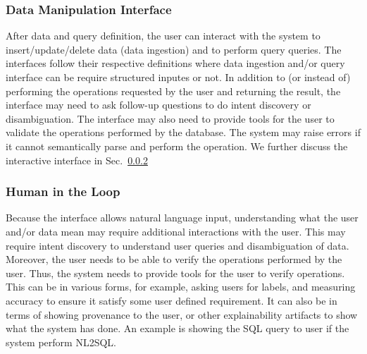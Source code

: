 



\subsubsection{Data Manipulation Interface}
After data and query definition, the user can interact with the system to insert/update/delete data (data ingestion) and to perform query queries. The interfaces follow their respective definitions where data ingestion and/or query interface can be require structured inputes or not. In addition to (or instead of) performing the operations requested by the user and returning the result, the interface may need to ask follow-up questions to do intent discovery or disambiguation. The interface may also need to provide tools for the user to validate the operations performed by the database. The system may raise errors if it cannot semantically parse and perform the operation. We further discuss the interactive interface in Sec.~\ref{sec:hil}



\subsubsection{Human in the Loop}\label{sec:hil}
Because the interface allows natural language input, understanding what the user and/or data mean may require additional interactions with the user. This may require intent discovery to understand user queries and disambiguation of data. Moreover, the user needs to be able to verify the operations performed by the user. Thus, the system needs to provide tools for the user to verify operations. This can be in various forms, for example, asking users for labels, and measuring accuracy to ensure it satisfy some user defined requirement. It can also be in terms of showing provenance to the user, or other explainability artifacts to show what the system has done. An example is showing the SQL query to user if the system perform NL2SQL. 


